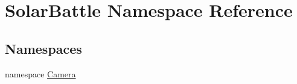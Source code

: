 \hypertarget{namespace_solar_battle}{}\section{Solar\+Battle Namespace Reference}
\label{namespace_solar_battle}
\subsection*{Namespaces}
\begin{DoxyCompactItemize}
\item 
namespace \mbox{\hyperlink{namespace_solar_battle_1_1_camera}{Camera}}
\end{DoxyCompactItemize}
